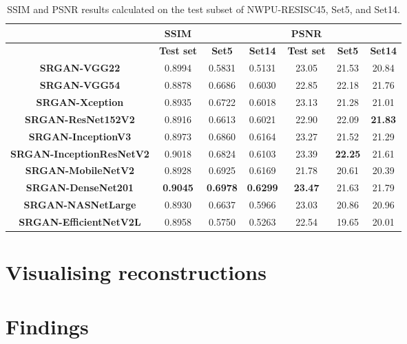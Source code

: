 \begin{table}[h]
    \centering
    \begin{tabular}{ccccccc}
        \toprule
        {} & \textbf{SSIM} & {} & {} & \textbf{PSNR}  & {} & {} \\
        \midrule
        {} & \textbf{Test set} & \textbf{Set5} & \textbf{Set14} & \textbf{Test set} & \textbf{Set5} & \textbf{Set14} \\ 
        \midrule
        \textbf{SRGAN-VGG22} & 0.8994 & 0.5831 & 0.5131 & 23.05 & 21.53 & 20.84 \\  
        \textbf{SRGAN-VGG54} & 0.8878 & 0.6686 & 0.6030 & 22.85 & 22.18 & 21.76 \\ 
        \textbf{SRGAN-Xception} & 0.8935 & 0.6722 & 0.6018 & 23.13 & 21.28 & 21.01 \\  
        \textbf{SRGAN-ResNet152V2} & 0.8916 & 0.6613 & 0.6021 & 22.90 & 22.09 & \textbf{21.83} \\ 
        \textbf{SRGAN-InceptionV3} & 0.8973 & 0.6860 & 0.6164 & 23.27 & 21.52 & 21.29 \\ 
        \textbf{SRGAN-InceptionResNetV2} & 0.9018 & 0.6824 & 0.6103 & 23.39 & \textbf{22.25} & 21.61 \\ 
        \textbf{SRGAN-MobileNetV2} & 0.8928 & 0.6925 & 0.6169 & 21.78 & 20.61 & 20.39 \\ 
        \textbf{SRGAN-DenseNet201} & \textbf{0.9045} & \textbf{0.6978} & \textbf{0.6299} & \textbf{23.47} & 21.63 & 21.79 \\
        \textbf{SRGAN-NASNetLarge} & 0.8930 & 0.6637 & 0.5966 & 23.03 & 20.86 & 20.96 \\
        \textbf{SRGAN-EfficientNetV2L} & 0.8958 & 0.5750 & 0.5263 & 22.54 & 19.65 & 20.01 \\
        \bottomrule
    \end{tabular}
    \caption{SSIM and PSNR results calculated on the test subset of NWPU-RESISC45, Set5, and Set14.}
    \label{fig:performance_results}
\end{table}

\section{Visualising reconstructions}

\section{Findings}

